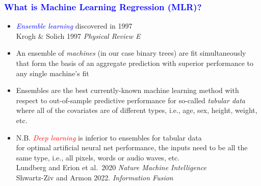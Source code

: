 \documentclass[11pt,dvipsnames,usenames,times]{beamer}
\newcommand*{\red}[1]{\textcolor{red}{#1}}%
\newcommand*{\blue}[1]{\textcolor{blue}{#1}}%
\begin{document}
\begin{frame}
\frametitle{\bf\textcolor{blue}{What is Machine Learning Regression (MLR)?}}
\boldmath

\begin{itemize}
\item \blue{\it Ensemble learning} discovered
in 1997 \\
Krogh \& Solich 1997 {\it Physical Review E}
\item
  An ensemble of {\it machines} (in our case binary trees) are fit
  simultaneously that form the basis of an aggregate
  prediction with superior performance to any
  single machine's fit\\
\item Ensembles are
 the best currently-known machine
  learning method with respect to out-of-sample predictive performance
  for so-called {\it tabular data} where all of the
  covariates are of different types, i.e., age, sex, height, weight, etc.\\
\item N.B. \red{\it Deep learning} is inferior to ensembles for tabular data\\
  for optimal artificial neural net performance, the inputs need to be
  all the same type, i.e., all pixels, words or audio waves, etc.\\

Lundberg and Erion et al.\ 2020 {\it Nature Machine Intelligence}\\
Shwartz-Ziv and Armon 2022. {\it Information Fusion}
\end{itemize}

\end{frame}
\end{document}
